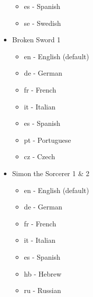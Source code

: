 \begin{itemize}
\begin{itemize}
  \item es  - Spanish
  \item se  - Swedish
  \end{itemize}
\item Broken Sword 1
  \begin{itemize}
  \item en  - English (default)
  \item de  - German
  \item fr  - French
  \item it  - Italian
  \item es  - Spanish
  \item pt  - Portuguese
  \item cz  - Czech
  \end{itemize}
\item Simon the Sorcerer 1 \& 2
  \begin{itemize}
  \item en  - English (default)
  \item de  - German
  \item fr  - French
  \item it  - Italian
  \item es  - Spanish
  \item hb  - Hebrew
  \item ru  - Russian
  \end{itemize}
\end{itemize}
